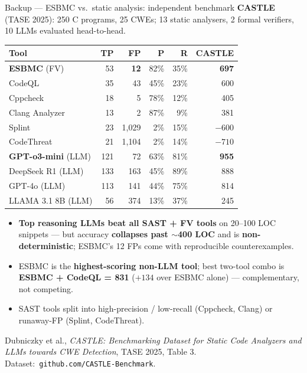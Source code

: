 \documentclass[aspectratio=169,11pt]{beamer}
\newcommand{\hil}[1]{\textbf{\textcolor{nvgreendark}{#1}}}
\newcommand{\bad}[1]{\textbf{\textcolor{nvred}{#1}}}
\begin{document}
\begin{frame}{Backup --- ESBMC vs.\ static analysis: independent benchmark}
  \scriptsize
  \textbf{CASTLE} (TASE 2025): 250 C programs, 25 CWEs; 13 static
  analysers, 2 formal verifiers, 10 LLMs evaluated head-to-head.

  \vspace{0.3em}
  \centering
  \renewcommand{\arraystretch}{0.95}
  \begin{tabular}{@{} l r r r r r @{}}
    \toprule
    \textbf{Tool} & \textbf{TP} & \textbf{FP} & \textbf{P}
                  & \textbf{R} & \textbf{CASTLE} \\
    \midrule
    \hil{ESBMC} (FV)        & 53  & \hil{12}    & 82\% & 35\% & \hil{697} \\
    CodeQL                  & 35  & 43          & 45\% & 23\% & 600 \\
    Cppcheck                & 18  & 5           & 78\% & 12\% & 405 \\
    Clang Analyzer          & 13  & 2           & 87\% &  9\% & 381 \\
    Splint                  & 23  & 1{,}029     &  2\% & 15\% & $-600$ \\
    CodeThreat              & 21  & 1{,}104     &  2\% & 14\% & $-710$ \\
    \midrule
    \hil{GPT-o3-mini} (LLM) & 121 & 72          & 63\% & 81\% & \hil{955} \\
    DeepSeek R1 (LLM)       & 133 & 163         & 45\% & 89\% & 888 \\
    GPT-4o (LLM)            & 113 & 141         & 44\% & 75\% & 814 \\
    LLAMA 3.1 8B (LLM)      & 56  & 374         & 13\% & 37\% & 245 \\
    \bottomrule
  \end{tabular}

  \vspace{0.2em}
  \raggedright
  \begin{itemize}\setlength\itemsep{0.02em}
    \item \hil{Top reasoning LLMs beat all SAST + FV tools} on 20--100
          LOC snippets --- but accuracy \bad{collapses past $\sim$400
          LOC} and is \bad{non-deterministic}; ESBMC's 12 FPs come with
          reproducible counterexamples.
    \item ESBMC is the \hil{highest-scoring non-LLM tool}; best
          two-tool combo is \hil{ESBMC + CodeQL = 831}
          ($+134$ over ESBMC alone) --- complementary, not competing.
    \item SAST tools split into high-precision / low-recall (Cppcheck,
          Clang) or runaway-FP (Splint, CodeThreat).
  \end{itemize}

  \vspace{0.1em}
  {\tiny\textcolor{nvgray}{Dubniczky et al., \emph{CASTLE: Benchmarking
  Dataset for Static Code Analyzers and LLMs towards CWE Detection},
  TASE 2025, Table 3. Dataset:~\texttt{github.com/CASTLE-Benchmark}.}}
\end{frame}
\end{document}
